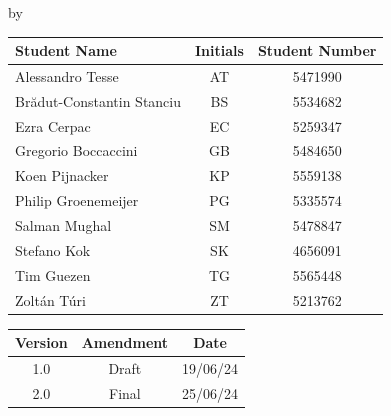 
\begin{titlepage}

\begin{center}

{\makeatletter
\largetitlestyle\fontsize{45}{45}\selectfont\@title
\makeatother}

{\makeatletter
\ifdefvoid{\@subtitle}{}{\bigskip\titlestyle\fontsize{35}{35}\selectfont\@subtitle}
\makeatother}

\bigskip
\bigskip

by

\bigskip
\bigskip

{\makeatletter
\largetitlestyle\fontsize{25}{25}\selectfont\@author
\makeatother}

\bigskip
\bigskip

\setlength\extrarowheight{2pt}
\begin{tabular}{lcc}
    Student Name              &Initials& Student Number \\\midrule
    Alessandro Tesse          &AT& 5471990 \\
    Brădut-Constantin Stanciu &BS& 5534682 \\
    Ezra Cerpac               &EC& 5259347 \\
    Gregorio Boccaccini       &GB& 5484650 \\
    Koen Pijnacker            &KP& 5559138 \\
    Philip Groenemeijer       &PG& 5335574 \\
    Salman Mughal             &SM& 5478847 \\
    Stefano Kok               &SK& 4656091 \\
    Tim Guezen                &TG& 5565448 \\
    Zoltán Túri                 &ZT& 5213762 \\
\end{tabular}

\vfill

\begin{table}[ht]
    \centering
    \label{tab:verscontr}
    \begin{tabular}{ccc}
        Version &  Amendment             & Date       \\ \midrule
        1.0     & Draft                  & 19/06/24   \\
        2.0     & Final                  & 25/06/24 \\ \bottomrule
        

\end{tabular}
\end{table}
\end{center}
\end{titlepage}
